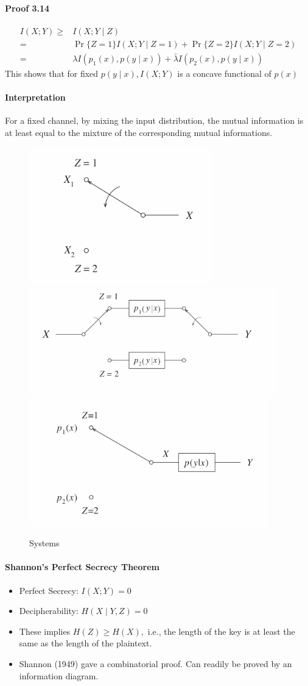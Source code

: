 \documentclass[8pt]{article}
\begin{document}
\paragraph{Proof 3.14}
$$
\begin{aligned}
I(X ; Y)
\geq & I(X ; Y \mid Z) \\
=& \operatorname{Pr}\{Z=1\} I(X ; Y \mid Z=1) +\operatorname{Pr}\{Z=2\} I(X ; Y \mid Z=2) \\
=& \lambda I\left(p_{1}(x), p(y \mid x)\right)+\bar{\lambda} I\left(p_{2}(x), p(y \mid x)\right)
\end{aligned}
$$
This shows that for fixed $p(y \mid x), I(X ; Y)$ is a concave functional of $p(x)$

\paragraph{Interpretation} For a fixed channel, by mixing the input distribution, the mutual information is at least equal to the mixture of the corresponding mutual informations.

\begin{figure}[!h]
    \centering
    \includegraphics[width=0.22\linewidth]{imgs/exp3_12.png}
    \includegraphics[width=0.3\linewidth]{imgs/exp3_13.png} \qquad
    \includegraphics[width=0.3\linewidth]{imgs/exp3_14.png}
    \caption{Systems}
    \label{fig:my_label}
\end{figure}

\begin{tcolorbox}
\paragraph{Shannon's Perfect Secrecy Theorem}
\begin{itemize}
    \item Perfect Secrecy: $I(X ; Y)=0$
    \item Decipherability: $H(X \mid Y, Z)=0$
    \item These implies $H(Z) \geq H(X),$ i.e., the length of the key is at least the same as the length of the plaintext.
    \item Shannon (1949) gave a combinatorial proof. Can readily be proved by an information diagram.
\end{itemize}
\end{tcolorbox}
\end{document}
